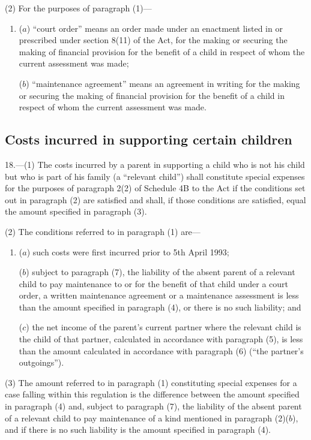 \documentclass[a4paper]{article}
\begin{document}
(2) For the purposes of paragraph (1)—
\begin{enumerate}\item[]
($a$) “court order” means an order made under an enactment listed in or prescribed under section 8(11) of the Act, for the making or securing the making of financial provision for the benefit of a child in respect of whom the current assessment was made;

($b$) “maintenance agreement” means an agreement in writing for the making or securing the making of financial provision for the benefit of a child in respect of whom the current assessment was made.
\end{enumerate}

\subsection[18. Costs incurred in supporting certain children]{Costs incurred in supporting certain children}

18.—(1) The costs incurred by a parent in supporting a child who is not his child but who is part of his family (a “relevant child”) shall constitute special expenses for the purposes of paragraph 2(2) of Schedule 4B to the Act if the conditions set out in paragraph (2) are satisfied and shall, if those conditions are satisfied, equal the amount specified in paragraph (3).

(2) The conditions referred to in paragraph (1) are—
\begin{enumerate}\item[]
($a$) such costs were first incurred prior to 5th April 1993;

($b$) subject to paragraph (7), the liability of the absent parent of a relevant child to pay maintenance to or for the benefit of that child under a court order, a written maintenance agreement or a maintenance assessment is less than the amount specified in paragraph (4), or there is no such liability; and

($c$) the net income of the parent’s current partner where the relevant child is the child of that partner, calculated in accordance with paragraph (5), is less than the amount calculated in accordance with paragraph (6) (“the partner’s outgoings”).
\end{enumerate}

(3) The amount referred to in paragraph (1) constituting special expenses for a case falling within this regulation is the difference between the amount specified in paragraph (4) and, subject to paragraph (7), the liability of the absent parent of a relevant child to pay maintenance of a kind mentioned in paragraph (2)($b$), and if there is no such liability is the amount specified in paragraph (4).
\end{document}
